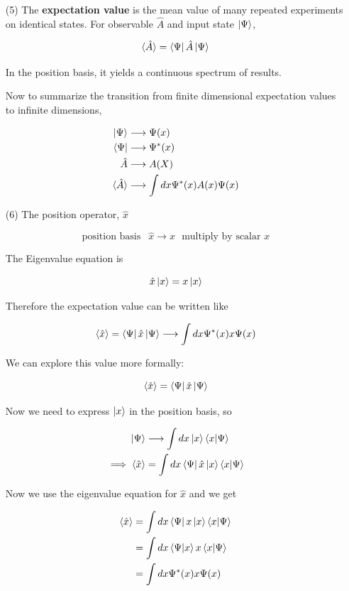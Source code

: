 \documentclass[english, 11pt]{article}
\begin{document}
\begin{itemize}
      \item[(5)] The \textbf{expectation value} is the mean value of many repeated experiments on identical states. For observable $\hat{A}$ and input state $\left|\Psi\right\rangle$,

      \[ \langle \hat{A} \rangle = \left\langle\Psi\right|\hat{A}\left|\Psi\right\rangle \]

      In the position basis, it yields a continuous spectrum of results.

      Now to summarize the transition from finite dimensional expectation values to infinite dimensions,

      \begin{align*}
        \left|\Psi\right\rangle & \longrightarrow \Psi(x) \\
        \left\langle\Psi\right| & \longrightarrow \Psi^*(x) \\
        \hat{A} & \longrightarrow A(X) \\
        \langle \hat{A} \rangle & \longrightarrow \int dx \Psi^*(x)A(x)\Psi(x)
      \end{align*}

      \item[(6)] The position operator, $\hat{x}$

      \[ \mbox{position basis } \ \ \hat{x} \longrightarrow x \ \ \ \mbox{multiply by scalar $x$} \]

      The Eigenvalue equation is

      \[ \hat{x}\left|x\right\rangle = x\left|x\right\rangle \]

      Therefore the expectation value can be written like

      \[ \langle \hat{x} \rangle = \left\langle\Psi\right|\hat{x}\left|\Psi\right\rangle \longrightarrow \int dx \Psi^*(x)x\Psi(x) \]

      We can explore this value more formally:

      \[ \langle \hat{x} \rangle = \left\langle\Psi\right|\hat{x}\left|\Psi\right\rangle \]

      Now we need to express $\left|x\right\rangle$ in the position basis, so

      \begin{align*}
        \kpsi & \longrightarrow \int dx \kx \braket{x}{\Psi} \\
        \implies \E{\hat{x}} & = \int dx \bra{\Psi}\hat{x}\kx \braket{x}{\Psi}
      \end{align*}

      Now we use the eigenvalue equation for $\hat{x}$ and we get

      \begin{align*}
         \E{\hat{x}} & = \int dx \bra{\Psi}x\kx \braket{x}{\Psi} \\
                     & = \int dx \braket{\Psi}{x}x\braket{x}{\Psi} \\
                     & = \int dx \Psi^*(x)x\Psi(x)
      \end{align*}


\end{itemize}
\end{document}
